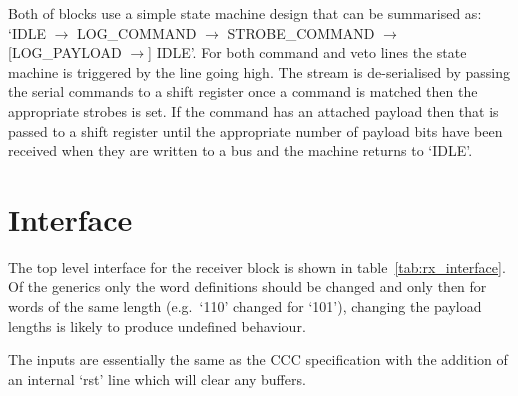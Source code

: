 Both of blocks use a simple state machine design that can be summarised as: `IDLE \( \rightarrow \) LOG\_COMMAND \( \rightarrow \) STROBE\_COMMAND \( \rightarrow \) [LOG\_PAYLOAD \( \rightarrow \)] IDLE'. For both command and veto lines the state machine is triggered by the line going high. The stream is de-serialised by passing the serial commands to a shift register once a command is matched then the appropriate strobes is set. If the command has an attached payload then that is passed to a shift register until the appropriate number of payload bits have been received when they are written to a bus and the machine returns to `IDLE'.
\section{Interface} %
\label{sub:rx_interface}
The top level interface for the receiver block is shown in table~\ref{tab:rx_interface}. Of the generics only the word definitions should be changed and only then for words of the same length (e.g.\ `110' changed for `101'), changing the payload lengths is likely to produce undefined behaviour.
    
The inputs are essentially the same as the CCC specification with the addition of an internal `rst' line which will clear any buffers.
    
